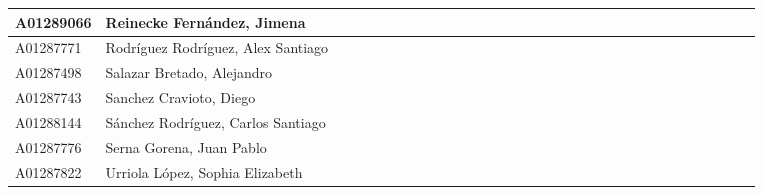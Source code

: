 \documentclass{article}
\begin{document}
\begin{table}[!ht]
\begin{tabular}{|l|l|l|l|l|l|l|l|l|l|l|l|l|l|l|l|l|l|l|l|l|l|l|l|l|l|l|l|l|l|l|l|}
        A01289066 & Reinecke Fernández, Jimena & & & & & & & & & & & & & & & & & & & & & & & & & & & & &\\ \hline
        A01287771 & Rodríguez Rodríguez, Alex Santiago & & & & & & & & & & & & & & & & & & & & & & & & & & & & &\\ \hline
        A01287498 & Salazar Bretado, Alejandro & & & & & & & & & & & & & & & & & & & & & & & & & & & & &\\ \hline
        A01287743 & Sanchez Cravioto, Diego & & & & & & & & & & & & & & & & & & & & & & & & & & & & &\\ \hline
        A01288144 & Sánchez Rodríguez, Carlos Santiago & & & & & & & & & & & & & & & & & & & & & & & & & & & & &\\ \hline
        A01287776 & Serna Gorena, Juan Pablo & & & & & & & & & & & & & & & & & & & & & & & & & & & & &\\ \hline
        A01287822 & Urriola López, Sophia Elizabeth & & & & & & & & & & & & & & & & & & & & & & & & & & & & &\\ \hline
    \end{tabular}
\end{table}
\end{document}
